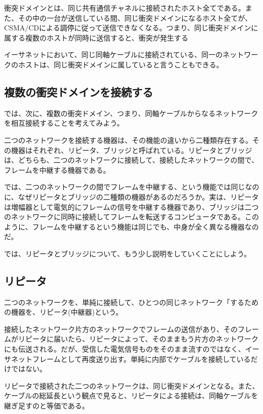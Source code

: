 衝突ドメインとは、同じ共有通信チャネルに接続されたホスト全てである。また、その中の一台が送信している間、同じ衝突ドメインになるホスト全てが、CSMA/CDによる調停に従って送信できなくなる。つまり、同じ衝突ドメインに属する複数のホストが同時に送信すると、衝突が発生する

イーサネットにおいて、同じ同軸ケーブルに接続されている、同一のネットワークのホストは、同じ衝突ドメインに属していると言うこともできる。

\subsection{複数の衝突ドメインを接続する}




では、次に、複数の衝突ドメイン、つまり、同軸ケーブルからなるネットワークを相互接続することを考えてみよう。

二つのネットワークを接続する機器は、その機能の違いから二種類存在する。その機器はそれぞれ、リピータ、ブリッジと呼ばれている。リピータとブリッジは、どちらも、二つのネットワークに接続して、接続したネットワークの間で、フレームを中継する機器である。

では、二つのネットワークの間でフレームを中継する、という機能では同じなのに、なぜリピータとブリッジの二種類の機器があるのだろうか。実は、リピータは増幅器として電気的にフレームの信号を中継する機器であり、ブリッジは二つのネットワークに同時に接続してフレームを転送するコンピュータである。このように、フレームを中継するという機能は同じでも、中身が全く異なる機器なのだ。

では、リピータとブリッジについて、もう少し説明をしていくことにしよう。

\subsection{リピータ}

二つのネットワークを、単純に接続して、ひとつの同じネットワーク「するための機器を、リピータ(中継器)という。

接続したネットワーク片方のネットワークでフレームの送信があり、そのフレームがリピータに届いたら、リピータによって、そのままもう片方のネットワークにも伝送される。だが、受信した電気信号ものをそのまま流すのではなく、イーサネットフレームとして再度送り出す。単純に内部でケーブルを接続しているだけではない。

リピータで接続された二つのネットワークは、同じ衝突ドメインとなる。また、ケーブルの総延長という観点で見ると、リピータによる接続は、同軸ケーブルを継ぎ足すのと等価である。

